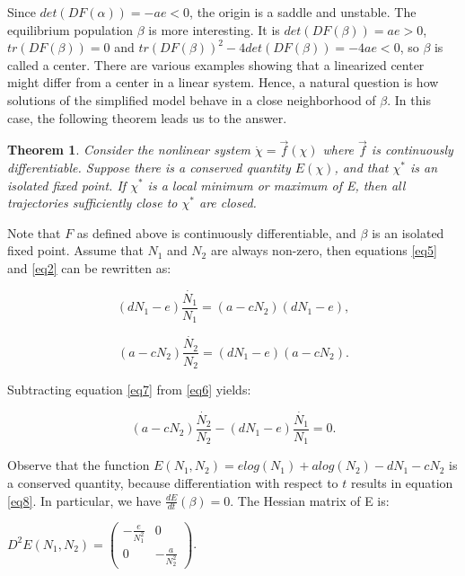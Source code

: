 \documentclass[11pt,a4paper]{scrartcl}
\newtheorem*{theorem}{Theorem}
\theoremstyle{definition}
\begin{document}
Since $det(DF(\alpha))=-ae<0$, the origin is a saddle and unstable. The equilibrium population $\beta$ is more interesting. It is $det(DF(\beta))=ae>0$, $tr(DF(\beta))=0$ and $tr(DF(\beta))^2-4det(DF(\beta))=-4ae<0$, so $\beta$ is called a center. There are various examples showing that a linearized center might differ from a center in a linear system. Hence, a natural question is how solutions of the simplified model behave in a close neighborhood of $\beta$. In this case, the following theorem leads us to the answer.

\begin{theorem}
	Consider the nonlinear system $\dot{\chi}=\vec{f}(\chi)$ where $\vec{f}$ is continuously differentiable. Suppose there is a conserved quantity $E(\chi)$, and that $\chi^{*}$ is an isolated fixed point. If $\chi^{*}$ is a local minimum or maximum of E, then all trajectories sufficiently close to $\chi^{*}$ are closed.
\end{theorem}

Note that $F$ as defined above is continuously differentiable, and $\beta$ is an isolated fixed point. Assume that $N_1$ and 
$N_2$ are always non-zero, then equations \eqref{eq5} and \eqref{eq2} can be rewritten as:

\begin{equation} \label{eq6}
	(dN_1-e)\frac{\dot{N_1}}{N_1}=(a-cN_2)(dN_1-e),
\end{equation}

\begin{equation} \label{eq7}
	(a-cN_2)\frac{\dot{N_2}}{N_2}=(dN_1-e)(a-cN_2).
\end{equation}

Subtracting equation \eqref{eq7} from \eqref{eq6} yields:

\begin{equation} \label{eq8}
	(a-cN_2)\frac{\dot{N_2}}{N_2}-(dN_1-e)\frac{\dot{N_1}}{N_1}=0.
\end{equation}

Observe that the function $E(N_1, N_2)=elog(N_1)+alog(N_2)-dN_1-cN_2$ is a conserved quantity, because differentiation with respect to $t$ results in equation \eqref{eq8}. In particular, we have $\frac{dE}{dt}(\beta)=0$. The Hessian matrix of E is:

\begin{center}
$D^2E(N_1,N_2)=\begin{pmatrix}
	-\frac{e}{N_1^{2}} & 0 \\
	0 & -\frac{a}{N_2^{2}}
\end{pmatrix}$.
\end{center}
\end{document}

